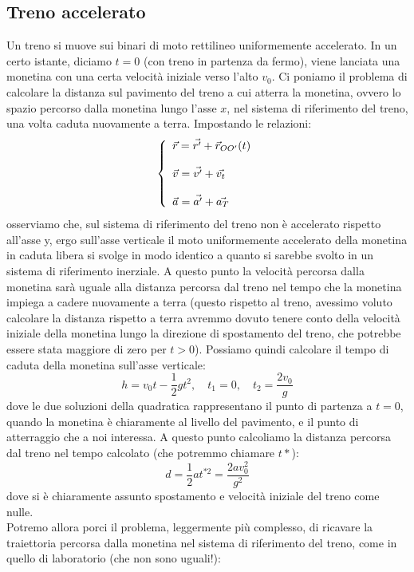 \documentclass[a4paper,12pt]{article}
\begin{document}
\subsection{Treno accelerato}
Un treno si muove sui binari di moto rettilineo uniformemente accelerato. In un certo istante, diciamo $t = 0$ (con treno
in partenza da fermo), viene lanciata una monetina con una certa velocità iniziale verso l'alto $v_0$. Ci poniamo il problema
di calcolare la distanza sul pavimento del treno a cui atterra la monetina, ovvero lo spazio percorso dalla monetina 
lungo l'asse $x$, nel sistema di riferimento del treno, una volta caduta nuovamente a terra. Impostando le relazioni:
$$ 
\left\{\begin{array}{l}
    \vec{r} = \vec{r'} + \vec{r}_{OO'}(t) \cr \\
  \vec{v} = \vec{v'} + \vec{v_t} \cr \\
  \vec{a} = \vec{a'} + \vec{a_T}
\end{array}\right.
$$
osserviamo che, sul sistema di riferimento del treno non è accelerato rispetto all'asse y, ergo sull'asse verticale
il moto uniformemente accelerato della monetina in caduta libera si svolge in modo identico a quanto si sarebbe svolto
in un sistema di riferimento inerziale. A questo punto la velocità percorsa dalla monetina sarà uguale alla distanza percorsa
dal treno nel tempo che la monetina impiega a cadere nuovamente a terra (questo rispetto al treno, avessimo voluto calcolare
la distanza rispetto a terra avremmo dovuto tenere conto della velocità iniziale della monetina lungo la direzione
di spostamento del treno, che potrebbe essere stata maggiore di zero per $t > 0$). Possiamo quindi calcolare il
tempo di caduta della monetina sull'asse verticale:
$$ h = v_0t-\frac{1}{2}gt^2, \quad t_1 = 0, \quad t_2 = \frac{2v_0}{g}$$
dove le due soluzioni della quadratica rappresentano il punto di partenza a $t=0$, quando la monetina è chiaramente al livello del pavimento,
e il punto di atterraggio che a noi interessa. A questo punto calcoliamo la distanza percorsa dal treno nel tempo calcolato (che potremmo
chiamare $t*$):
$$ d = \frac{1}{2}at^{*2} = \frac{2av_0^2}{g^2} $$
dove si è chiaramente assunto spostamento e velocità iniziale del treno come nulle. \\
Potremo allora porci il problema, leggermente più complesso, di ricavare la traiettoria percorsa dalla monetina
nel sistema di riferimento del treno, come in quello di laboratorio (che non sono uguali!):
\end{document}
